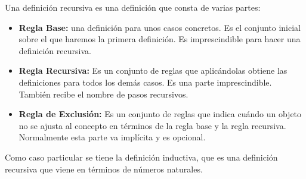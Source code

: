 Una definición recursiva es una definición que consta de varias partes:
\begin{itemize}
\item \textbf{Regla Base:} una definición para unos casos concretos. Es el conjunto inicial sobre el que haremos la primera definición. Es imprescindible para hacer una definición recursiva. 

\item \textbf{Regla Recursiva:} Es un conjunto de reglas que aplicándolas obtiene las definiciones para todos los demás casos. Es una parte imprescindible. También recibe el nombre de pasos recursivos.

\item \textbf{Regla de Exclusión:} Es un conjunto de reglas que indica cuándo un objeto no se ajusta al concepto en términos de la regla base y la regla recursiva. Normalmente esta parte va implícita y es opcional.
\end{itemize}

Como caso particular se tiene la definición inductiva, que es una  definición recursiva que viene en términos de números naturales.

